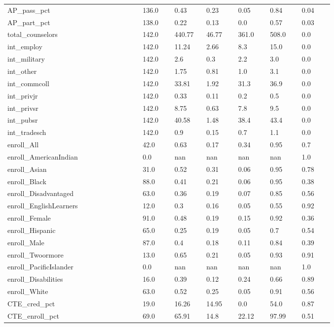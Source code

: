 \begin{threeparttable}
\begin{tabular}{ p{0.34\linewidth} p{0.08\linewidth} p{0.08\linewidth} p{0.08\linewidth} p{0.08\linewidth} p{0.08\linewidth} p{0.08\linewidth}}
 AP\_pass\_pct &  136.0  &  0.43 & 0.23 & 0.05 & 0.84 & 0.04  \\ 
 AP\_part\_pct &  138.0  &  0.22 & 0.13 & 0.0 & 0.57 & 0.03  \\ 
 total\_counselors &  142.0  &  440.77 & 46.77 & 361.0 & 508.0 & 0.0  \\ 
 int\_employ &  142.0  &  11.24 & 2.66 & 8.3 & 15.0 & 0.0  \\ 
 int\_military &  142.0  &  2.6 & 0.3 & 2.2 & 3.0 & 0.0  \\ 
 int\_other &  142.0  &  1.75 & 0.81 & 1.0 & 3.1 & 0.0  \\ 
 int\_commcoll &  142.0  &  33.81 & 1.92 & 31.3 & 36.9 & 0.0  \\ 
 int\_privjr &  142.0  &  0.33 & 0.11 & 0.2 & 0.5 & 0.0  \\ 
 int\_privsr &  142.0  &  8.75 & 0.63 & 7.8 & 9.5 & 0.0  \\ 
 int\_pubsr &  142.0  &  40.58 & 1.48 & 38.4 & 43.4 & 0.0  \\ 
 int\_tradesch &  142.0  &  0.9 & 0.15 & 0.7 & 1.1 & 0.0  \\ 
 enroll\_All &  42.0  &  0.63 & 0.17 & 0.34 & 0.95 & 0.7  \\ 
 enroll\_AmericanIndian &  0.0  &  nan & nan & nan & nan & 1.0  \\ 
 enroll\_Asian &  31.0  &  0.52 & 0.31 & 0.06 & 0.95 & 0.78  \\ 
 enroll\_Black &  88.0  &  0.41 & 0.21 & 0.06 & 0.95 & 0.38  \\ 
 enroll\_Disadvantaged &  63.0  &  0.36 & 0.19 & 0.07 & 0.85 & 0.56  \\ 
 enroll\_EnglishLearners &  12.0  &  0.3 & 0.16 & 0.05 & 0.55 & 0.92  \\ 
 enroll\_Female &  91.0  &  0.48 & 0.19 & 0.15 & 0.92 & 0.36  \\ 
 enroll\_Hispanic &  65.0  &  0.25 & 0.19 & 0.05 & 0.7 & 0.54  \\ 
 enroll\_Male &  87.0  &  0.4 & 0.18 & 0.11 & 0.84 & 0.39  \\ 
 enroll\_Twoormore &  13.0  &  0.65 & 0.21 & 0.05 & 0.93 & 0.91  \\ 
 enroll\_PacificIslander &  0.0  &  nan & nan & nan & nan & 1.0  \\ 
 enroll\_Disabilities &  16.0  &  0.39 & 0.12 & 0.24 & 0.66 & 0.89  \\ 
 enroll\_White &  63.0  &  0.52 & 0.25 & 0.05 & 0.91 & 0.56  \\ 
 CTE\_cred\_pct &  19.0  &  16.26 & 14.95 & 0.0 & 54.0 & 0.87  \\ 
 CTE\_enroll\_pct &  69.0  &  65.91 & 14.8 & 22.12 & 97.99 & 0.51  \\ 
\midrule
\end{tabular}

\end{threeparttable}

